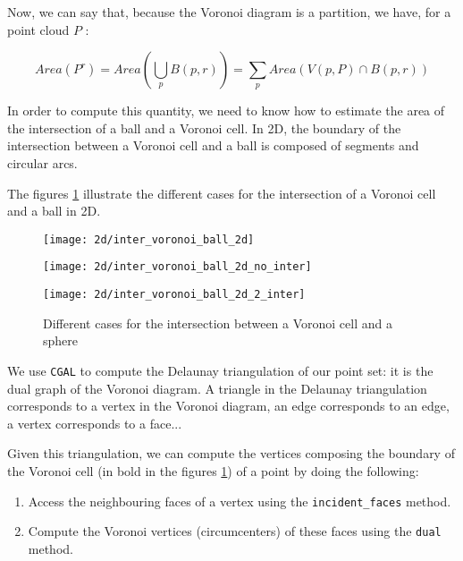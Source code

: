 Now, we can say that, because the Voronoi diagram is a partition, we have, for a
point cloud $ P $ :

$$ Area(P^r) = Area \left( \bigcup_p B(p, r) \right) = \sum_p Area(V(p, P) \cap B(p, r)) $$

In order to compute this quantity, we need to know how to estimate the area of the
intersection of a ball and a Voronoi cell. In 2D, the boundary of the
intersection between a Voronoi cell and a ball is composed of segments and
circular arcs.

The figures \ref{fig:inter_voronoi_ball_2d} illustrate the different cases for
the intersection of a Voronoi cell and a ball in 2D.

\begin{figure}[h]
    \centering
    \begin{minipage}{0.32\linewidth}
        \centering
        \texttt{[image: 2d/inter\_voronoi\_ball\_2d]}
        \label{fig:inter_voronoi_ball_2d:a}
    \end{minipage}
    \begin{minipage}{0.32\linewidth}
        \centering
        \texttt{[image: 2d/inter\_voronoi\_ball\_2d\_no\_inter]}
        \label{fig:inter_voronoi_ball_2d:b}
    \end{minipage}
    \begin{minipage}{0.32\linewidth}
        \centering
        \texttt{[image: 2d/inter\_voronoi\_ball\_2d\_2\_inter]}
        \label{fig:inter_voronoi_ball_2d:c}
    \end{minipage}

   \caption{Different cases for the intersection between a Voronoi cell and a sphere}
   \label{fig:inter_voronoi_ball_2d}
\end{figure}

We use \texttt{CGAL} to compute the Delaunay triangulation of our point set: it
is the dual graph of the Voronoi diagram. A triangle in the Delaunay
triangulation corresponds to a vertex in the Voronoi diagram, an edge
corresponds to an edge, a vertex corresponds to a face...

Given this triangulation, we can compute the vertices composing the boundary of
the  Voronoi cell (in bold in the figures \ref{fig:inter_voronoi_ball_2d}) of a
point by doing the following:
\begin{enumerate}
    \item Access the neighbouring faces of a vertex using the
        \texttt{incident\_faces} method.
    \item Compute the Voronoi vertices (circumcenters) of these faces using the
        \texttt{dual} method.
\end{enumerate}

